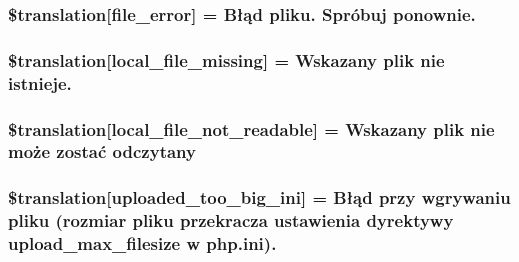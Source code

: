 \subsubsection[{\$translation}]{\setlength{\rightskip}{0pt plus 5cm}\$translation\mbox{[}\textquotesingle{}file\+\_\+error\textquotesingle{}\mbox{]} = \textquotesingle{}Błąd pliku. Spróbuj ponownie.\textquotesingle{}}\label{class_8upload_8pl___p_l_8php_ac7498e49b9771b04698029aa61c70821}
\hypertarget{class_8upload_8pl___p_l_8php_a6ec3d3a47ab70d77e7aa593e82ead10e}{}
\subsubsection[{\$translation}]{\setlength{\rightskip}{0pt plus 5cm}\$translation\mbox{[}\textquotesingle{}local\+\_\+file\+\_\+missing\textquotesingle{}\mbox{]} = \textquotesingle{}Wskazany plik nie istnieje.\textquotesingle{}}\label{class_8upload_8pl___p_l_8php_a6ec3d3a47ab70d77e7aa593e82ead10e}
\hypertarget{class_8upload_8pl___p_l_8php_a60104befef9b241f3a7a6a755618a4b3}{}
\subsubsection[{\$translation}]{\setlength{\rightskip}{0pt plus 5cm}\$translation\mbox{[}\textquotesingle{}local\+\_\+file\+\_\+not\+\_\+readable\textquotesingle{}\mbox{]} = \textquotesingle{}Wskazany plik nie może zostać odczytany\textquotesingle{}}\label{class_8upload_8pl___p_l_8php_a60104befef9b241f3a7a6a755618a4b3}
\hypertarget{class_8upload_8pl___p_l_8php_a6a08dcd0d3651fdd098568f6b2f0a42c}{}
\subsubsection[{\$translation}]{\setlength{\rightskip}{0pt plus 5cm}\$translation\mbox{[}\textquotesingle{}uploaded\+\_\+too\+\_\+big\+\_\+ini\textquotesingle{}\mbox{]} = \textquotesingle{}Błąd przy wgrywaniu pliku (rozmiar pliku przekracza ustawienia dyrektywy upload\+\_\+max\+\_\+filesize w php.\+ini).\textquotesingle{}}\label{class_8upload_8pl___p_l_8php_a6a08dcd0d3651fdd098568f6b2f0a42c}
\hypertarget{class_8upload_8pl___p_l_8php_a623d5b8b92169f57d7e43458aa911cbb}{}
